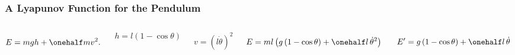 \documentclass[12pt]{beamer}
\begin{document}
\begin{frame}
\frametitle{A Lyapunov Function for the Pendulum}

\begin{columns}

\[
E = mgh + \onehalf m v^2.
\]

\[
h = l(1-\cos\theta)
\]

\[
v = (l\dot\theta)^2
\]

\[
E
	= ml \left( g \, (1-\cos\theta) + \onehalf l \, \dot\theta^2 \right)
\]

\[
E' = g \, (1-\cos\theta) + \onehalf l \, \dot\theta
\]

\includegraphics[width=\linewidth]{pic/Simple_gravity_pendulum.png}

\end{columns}

\end{frame}
\end{document}
